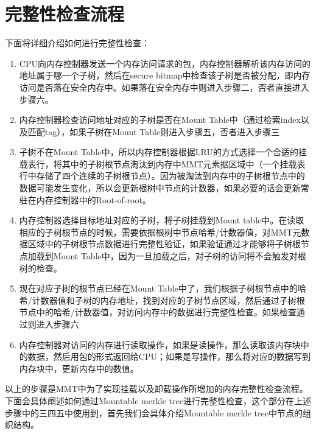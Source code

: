 \section{完整性检查流程}
下面将详细介绍如何进行完整性检查：
\begin{enumerate}
    \item CPU向内存控制器发送一个内存访问请求的包，内存控制器解析该内存访问的地址属于哪一个子树，然后在secure bitmap中检查该子树是否被分配，即内存访问是否落在安全内存中。如果落在安全内存中则进入步骤二，否者直接进入步骤六。
    \item 内存控制器检查访问地址对应的子树是否在Mount Table中（通过检索index以及匹配tag），如果子树在Mount Table则进入步骤五，否者进入步骤三
    \item 子树不在Mount Table中，所以内存控制器根据LRU的方式选择一个合适的挂载表行，将其中的子树根节点淘汰到内存中MMT元素据区域中（一个挂载表行中存储了四个连续的子树根节点）。因为被淘汰到内存中的子树根节点中的数据可能发生变化，所以会更新根树中节点的计数器，如果必要的话会更新常驻在内存控制器中的Root-of-root。
    \item 内存控制器选择目标地址对应的子树，将子树挂载到Mount table中。在读取相应的子树根节点的时候，需要依据根树中节点哈希/计数器值，对MMT元数据区域中的子树根节点数据进行完整性验证，如果验证通过才能够将子树根节点加载到Mount Table中，因为一旦加载之后，对子树的访问将不会触发对根树的检查。
    \item 现在对应子树的根节点已经在Mount Table中了，我们根据子树根节点中的哈希/计数器值和子树的内存地址，找到对应的子树节点区域，然后通过子树根节点中的哈希/计数器值，对访问内存中的数据进行完整性检查。如果检查通过则进入步骤六
    \item 内存控制器对访问的内存进行读取操作，如果是读操作，那么读取该内存块中的数据，然后用包的形式返回给CPU；如果是写操作，那么将对应的数据写到内存块中，更新内存中的数值。
\end{enumerate}
以上的步骤是MMT中为了实现挂载以及卸载操作所增加的内存完整性检查流程。下面会具体阐述如何通过Mountable merkle tree进行完整性检查，这个部分在上述步骤中的三四五中使用到，首先我们会具体介绍Mountable merkle tree中节点的组织结构。

